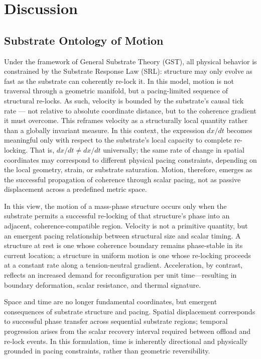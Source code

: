 \documentclass[entropy,article,submit,pdftex,moreauthors]{Definitions/mdpi}
\begin{document}
\section{Discussion}
\subsection{Substrate Ontology of Motion}

Under the framework of General Substrate Theory (GST), all physical behavior is constrained by the Substrate Response Law (SRL): structure may only evolve as fast as the substrate can coherently re-lock it. In this model, motion is not traversal through a geometric manifold, but a pacing-limited sequence of structural re-locks. As such, velocity is bounded by the substrate’s causal tick rate --- not relative to absolute coordinate distance, but to the coherence gradient it must overcome. This reframes velocity as a structurally local quantity rather than a globally invariant measure. In this context, the expression $dx/dt$ becomes meaningful only with respect to the substrate’s local capacity to complete re-locking. That is, $dx/dt \neq dx/dt$ universally; the same rate of change in spatial coordinates may correspond to different physical pacing constraints, depending on the local geometry, strain, or substrate saturation. Motion, therefore, emerges as the successful propagation of coherence through scalar pacing, not as passive displacement across a predefined metric space.

In this view, the motion of a mass-phase structure occurs only when the substrate permits a successful re-locking of that structure’s phase into an adjacent, coherence-compatible region. Velocity is not a primitive quantity, but an emergent pacing relationship between structural size and scalar timing. A structure at rest is one whose coherence boundary remains phase-stable in its current location; a structure in uniform motion is one whose re-locking proceeds at a constant rate along a tension-neutral gradient. Acceleration, by contrast, reflects an increased demand for reconfiguration per unit time—resulting in boundary deformation, scalar resistance, and thermal signature.

Space and time are no longer fundamental coordinates, but emergent consequences of substrate structure and pacing. Spatial displacement corresponds to successful phase transfer across sequential substrate regions; temporal progression arises from the scalar recovery interval required between offload and re-lock events. In this formulation, time is inherently directional and physically grounded in pacing constraints, rather than geometric reversibility.
\end{document}
